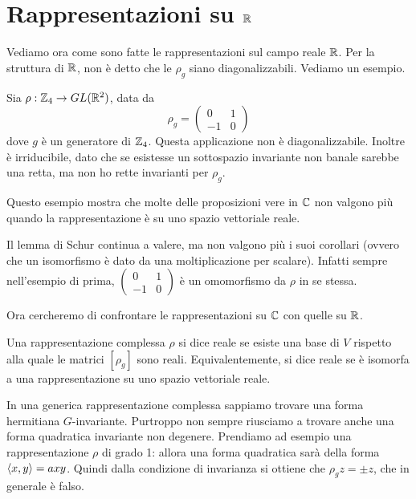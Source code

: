 \section{Rappresentazioni su $\mathbb R$}
	Vediamo ora come sono fatte le rappresentazioni sul campo reale $\mathbb R$. Per la struttura di $\mathbb R$, non è detto che le $\rho_g$ siano diagonalizzabili. Vediamo un esempio.
	
	\begin{myexample}
		Sia $\rho: \mathbb Z_4 \rightarrow GL(\mathbb R^2)$, data da 
			\[
				\rho_g = \left(
					\begin{matrix}
						0 	& 	1 	\\
						-1 	& 	0
					\end{matrix}
				\right)
			\]
		dove $g$ è un generatore di $\mathbb Z_4$. Questa applicazione non è diagonalizzabile. Inoltre è irriducibile, dato che se esistesse un sottospazio invariante non banale sarebbe una retta, ma non ho rette invarianti per $\rho_g$.
	\end{myexample}
	
	Questo esempio mostra che molte delle proposizioni vere in $\mathbb C$ non valgono più quando la rappresentazione è su uno spazio vettoriale reale.
	
	Il lemma di Schur continua a valere, ma non valgono più i suoi corollari (ovvero che un isomorfismo è dato da una moltiplicazione per scalare). Infatti sempre nell'esempio di prima, 
	$
		\left(
			\begin{matrix}
				0 	& 	1 	\\
				-1 	& 	0
			\end{matrix}
		\right)
	$ è un omomorfismo da $\rho$ in se stessa.
	
	Ora cercheremo di confrontare le rappresentazioni su $\mathbb C$ con quelle su $\mathbb R$.
	
	\begin{mydef}
	 Una rappresentazione complessa $\rho$ si dice reale se esiste una base di $V$ rispetto alla quale le matrici $[\rho_g]$ sono reali. Equivalentemente, si dice reale se è isomorfa a una rappresentazione su uno spazio vettoriale reale.
	\end{mydef}

	In una generica rappresentazione complessa sappiamo trovare una forma hermitiana $G$-invariante. Purtroppo non sempre riusciamo a trovare anche una forma quadratica invariante non degenere. Prendiamo ad esempio una rappresentazione $\rho$ di grado 1: allora una forma quadratica sarà della forma $\langle x , y\rangle = axy$. Quindi dalla condizione di invarianza si ottiene che $\rho_g z = \pm z$, che in generale è falso.
	
